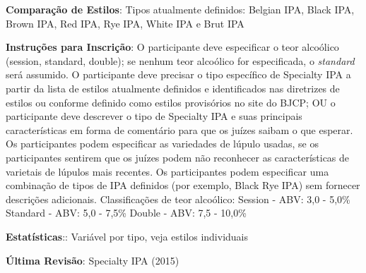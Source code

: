 \textbf{Comparação de Estilos}: Tipos atualmente definidos: Belgian IPA, Black IPA, Brown IPA, Red IPA, Rye IPA, White IPA e Brut IPA

\textbf{Instruções para Inscrição}: O participante deve especificar o teor alcoólico (session, standard, double); se nenhum teor alcoólico for especificada, o \textit{standard} será assumido. O participante deve precisar o tipo específico de Specialty IPA a partir da lista de estilos atualmente definidos e identificados nas diretrizes de estilos ou conforme definido como estilos provisórios no site do BJCP; OU o participante deve descrever o tipo de Specialty IPA e suas principais características em forma de comentário para que os juízes saibam o que esperar. Os participantes podem especificar as variedades de lúpulo usadas, se os participantes sentirem que os juízes podem não reconhecer as características de varietais de lúpulos mais recentes. Os participantes podem especificar uma combinação de tipos de IPA definidos (por exemplo, Black Rye IPA) sem fornecer descrições adicionais. Classificações de teor alcoólico: Session - ABV: 3,0 - 5,0\% Standard - ABV: 5,0 - 7,5\% Double - ABV: 7,5 - 10,0\%

\textbf{Estatísticas}:: Variável por tipo, veja estilos individuais

\textbf{Última Revisão}: Specialty IPA (2015)

